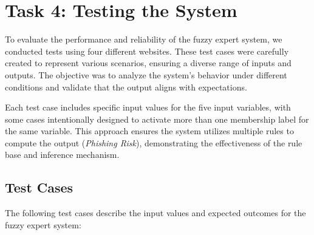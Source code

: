\documentclass{article}
\begin{document}
\section{Task 4: Testing the System}


To evaluate the performance and reliability of the fuzzy expert system, we conducted tests using four different websites. These test cases were carefully created to represent various scenarios, ensuring a diverse range of inputs and outputs. The objective was to analyze the system's behavior under different conditions and validate that the output aligns with expectations.

Each test case includes specific input values for the five input variables, with some cases intentionally designed to activate more than one membership label for the same variable. This approach ensures the system utilizes multiple rules to compute the output (\textit{Phishing Risk}), demonstrating the effectiveness of the rule base and inference mechanism.

\subsection{Test Cases}


The following test cases describe the input values and expected outcomes for the fuzzy expert system:
\end{document}
